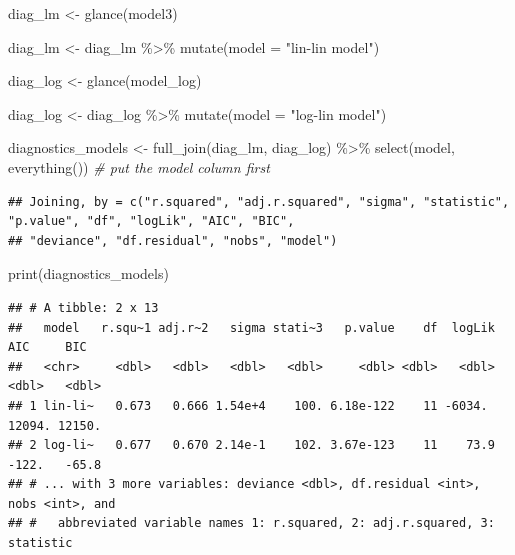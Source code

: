 \documentclass[
]{article}
\newenvironment{Shaded}{\begin{snugshade}}{\end{snugshade}}
\newcommand{\AttributeTok}[1]{\textcolor[rgb]{0.77,0.63,0.00}{#1}}
\newcommand{\CommentTok}[1]{\textcolor[rgb]{0.56,0.35,0.01}{\textit{#1}}}
\newcommand{\FunctionTok}[1]{\textcolor[rgb]{0.00,0.00,0.00}{#1}}
\newcommand{\NormalTok}[1]{#1}
\newcommand{\OtherTok}[1]{\textcolor[rgb]{0.56,0.35,0.01}{#1}}
\newcommand{\SpecialCharTok}[1]{\textcolor[rgb]{0.00,0.00,0.00}{#1}}
\newcommand{\StringTok}[1]{\textcolor[rgb]{0.31,0.60,0.02}{#1}}
\begin{document}
\begin{Shaded}
\begin{Highlighting}[]
\NormalTok{diag\_lm }\OtherTok{\textless{}{-}} \FunctionTok{glance}\NormalTok{(model3)}

\NormalTok{diag\_lm }\OtherTok{\textless{}{-}}\NormalTok{ diag\_lm }\SpecialCharTok{\%\textgreater{}\%}
  \FunctionTok{mutate}\NormalTok{(}\AttributeTok{model =} \StringTok{"lin{-}lin model"}\NormalTok{)}

\NormalTok{diag\_log }\OtherTok{\textless{}{-}} \FunctionTok{glance}\NormalTok{(model\_log)}

\NormalTok{diag\_log  }\OtherTok{\textless{}{-}}\NormalTok{ diag\_log }\SpecialCharTok{\%\textgreater{}\%}
  \FunctionTok{mutate}\NormalTok{(}\AttributeTok{model =} \StringTok{"log{-}lin model"}\NormalTok{)}

\NormalTok{diagnostics\_models }\OtherTok{\textless{}{-}} \FunctionTok{full\_join}\NormalTok{(diag\_lm, diag\_log) }\SpecialCharTok{\%\textgreater{}\%}
  \FunctionTok{select}\NormalTok{(model, }\FunctionTok{everything}\NormalTok{()) }\CommentTok{\# put the \textasciigrave{}model\textasciigrave{} column first}
\end{Highlighting}
\end{Shaded}

\begin{verbatim}
## Joining, by = c("r.squared", "adj.r.squared", "sigma", "statistic", "p.value", "df", "logLik", "AIC", "BIC",
## "deviance", "df.residual", "nobs", "model")
\end{verbatim}

\begin{Shaded}
\begin{Highlighting}[]
\FunctionTok{print}\NormalTok{(diagnostics\_models)}
\end{Highlighting}
\end{Shaded}

\begin{verbatim}
## # A tibble: 2 x 13
##   model   r.squ~1 adj.r~2   sigma stati~3   p.value    df  logLik    AIC     BIC
##   <chr>     <dbl>   <dbl>   <dbl>   <dbl>     <dbl> <dbl>   <dbl>  <dbl>   <dbl>
## 1 lin-li~   0.673   0.666 1.54e+4    100. 6.18e-122    11 -6034.  12094. 12150. 
## 2 log-li~   0.677   0.670 2.14e-1    102. 3.67e-123    11    73.9  -122.   -65.8
## # ... with 3 more variables: deviance <dbl>, df.residual <int>, nobs <int>, and
## #   abbreviated variable names 1: r.squared, 2: adj.r.squared, 3: statistic
\end{verbatim}
\end{document}
